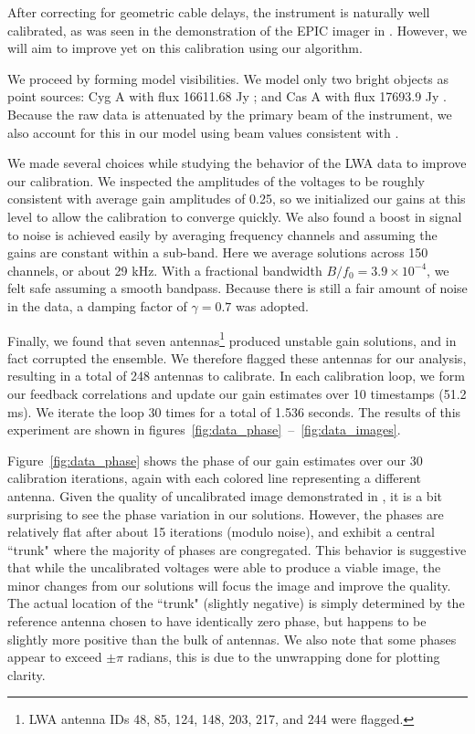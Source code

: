 \documentclass[a4paper,fleqn,usenatbib]{../mnras}
\begin{document}
After correcting for geometric cable delays, the instrument is naturally well calibrated, as was seen in the demonstration of the EPIC imager in \citealt{thy15c}. However, we will aim to improve yet on this calibration using our algorithm.

We proceed by forming model visibilities. We model only two bright objects as point sources: Cyg A with flux 16611.68 Jy \citep{coh07}; and Cas A with flux 17693.9 Jy \citep{kas07}. Because the raw data is attenuated by the primary beam of the instrument, we also account for this in our model using beam values consistent with \cite{hic12}.

We made several choices while studying the behavior of the LWA data to improve our calibration. We inspected the amplitudes of the voltages to be roughly consistent with average gain amplitudes of 0.25, so we initialized our gains at this level to allow the calibration to converge quickly. We also found a boost in signal to noise is achieved easily by averaging frequency channels and assuming the gains are constant within a sub-band. Here we average solutions across 150 channels, or about 29 kHz. With a fractional bandwidth $B/f_0 = 3.9 \times 10^{-4}$, we felt safe assuming a smooth bandpass. Because there is still a fair amount of noise in the data, a damping factor of $\gamma = 0.7$ was adopted.

Finally, we found that seven antennas\footnote{LWA antenna IDs 48, 85, 124, 148, 203, 217, and 244 were flagged.} produced unstable gain solutions, and in fact corrupted the ensemble. We therefore flagged these antennas for our analysis, resulting in a total of 248 antennas to calibrate. In each calibration loop, we form our feedback correlations and update our gain estimates over 10 timestamps (51.2 ms). We iterate the loop 30 times for a total of 1.536 seconds. The results of this experiment are shown in figures~\ref{fig:data_phase}~--~\ref{fig:data_images}.

Figure~\ref{fig:data_phase} shows the phase of our gain estimates over our 30 calibration iterations, again with each colored line representing a different antenna. Given the quality of uncalibrated image demonstrated in \cite{thy15c}, it is a bit surprising to see the phase variation in our solutions. However, the phases are relatively flat after about 15 iterations (modulo noise), and exhibit a central ``trunk" where the majority of phases are congregated. This behavior is suggestive that while the uncalibrated voltages were able to produce a viable image, the minor changes from our solutions will focus the image and improve the quality. The actual location of the ``trunk" (slightly negative) is simply determined by the reference antenna chosen to have identically zero phase, but happens to be slightly more positive than the bulk of antennas. We also note that some phases appear to exceed $\pm \pi$ radians, this is due to the unwrapping done for plotting clarity.
\end{document}
